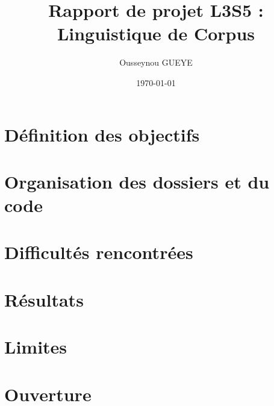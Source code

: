 \documentclass[12pt, a4paper]{report}%
\title{\textbf{Rapport de projet L3S5 : Linguistique de Corpus} }
\author{Ousseynou GUEYE}
\date{\today}
\begin{document}
\maketitle
		\begin{onehalfspace}

\tableofcontents



	\chapter{Définition des objectifs}


	\chapter{Organisation des dossiers et du code}


	\chapter{Difficultés rencontrées}


	\chapter{Résultats}


	\chapter{Limites}
%

	\chapter{Ouverture}
%



\end{onehalfspace}
\end{document}
